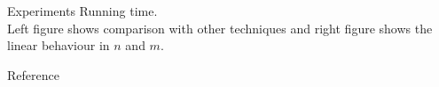 \documentclass[first=dgreen,second=purple,logo=redque]{aaltoslides}
\begin{document}
\begin{frame}[allowframebreaks=1]{Experiments}
\framebreak
Running time. \\
Left figure shows comparison with other techniques and right figure shows the linear behaviour in $n$ and $m$.
\begin{figure}
 \label{fig:fgtree}
\end{figure}
\end{frame}


\begin{frame}{Reference}
\small

\end{frame}
\end{document}
